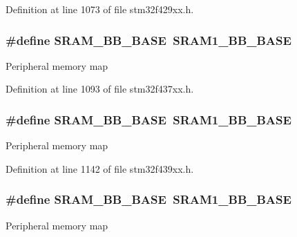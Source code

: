Definition at line 1073 of file stm32f429xx.\+h.

\subsubsection[{\texorpdfstring{S\+R\+A\+M\+\_\+\+B\+B\+\_\+\+B\+A\+SE}{SRAM_BB_BASE}}]{\setlength{\rightskip}{0pt plus 5cm}\#define S\+R\+A\+M\+\_\+\+B\+B\+\_\+\+B\+A\+SE~{\bf S\+R\+A\+M1\+\_\+\+B\+B\+\_\+\+B\+A\+SE}}\hypertarget{group___peripheral__memory__map_gad3548b6e2f017f39d399358f3ac98454}{}\label{group___peripheral__memory__map_gad3548b6e2f017f39d399358f3ac98454}
Peripheral memory map 

Definition at line 1093 of file stm32f437xx.\+h.

\subsubsection[{\texorpdfstring{S\+R\+A\+M\+\_\+\+B\+B\+\_\+\+B\+A\+SE}{SRAM_BB_BASE}}]{\setlength{\rightskip}{0pt plus 5cm}\#define S\+R\+A\+M\+\_\+\+B\+B\+\_\+\+B\+A\+SE~{\bf S\+R\+A\+M1\+\_\+\+B\+B\+\_\+\+B\+A\+SE}}\hypertarget{group___peripheral__memory__map_gad3548b6e2f017f39d399358f3ac98454}{}\label{group___peripheral__memory__map_gad3548b6e2f017f39d399358f3ac98454}
Peripheral memory map 

Definition at line 1142 of file stm32f439xx.\+h.

\subsubsection[{\texorpdfstring{S\+R\+A\+M\+\_\+\+B\+B\+\_\+\+B\+A\+SE}{SRAM_BB_BASE}}]{\setlength{\rightskip}{0pt plus 5cm}\#define S\+R\+A\+M\+\_\+\+B\+B\+\_\+\+B\+A\+SE~{\bf S\+R\+A\+M1\+\_\+\+B\+B\+\_\+\+B\+A\+SE}}\hypertarget{group___peripheral__memory__map_gad3548b6e2f017f39d399358f3ac98454}{}\label{group___peripheral__memory__map_gad3548b6e2f017f39d399358f3ac98454}
Peripheral memory map 

